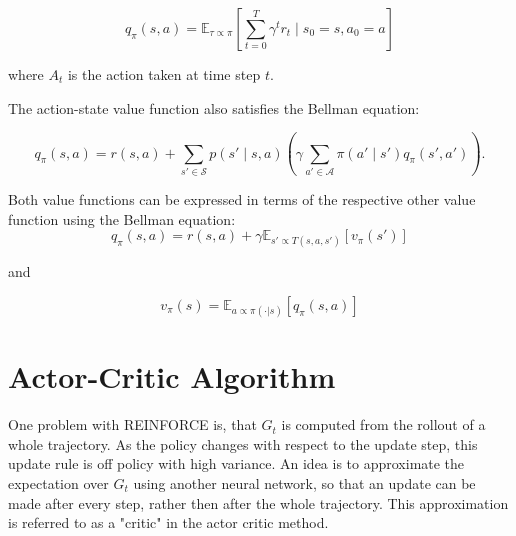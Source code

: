 \begin{equation}
    q_{\pi}(s, a) = \mathbb{E}_{\tau \propto \pi}\left[\sum_{t=0}^T \gamma^t r_t \mid s_0 = s, a_0=a\right]
\end{equation}

where $A_t$ is the action taken at time step $t$.

The action-state value function also satisfies the Bellman equation:

\begin{equation}
    \label{bmeq_q}
    q_{\pi}(s,a) = r(s,a) + \sum_{s' \in \mathcal{S}} p(s' \mid s,a) \left(\gamma \sum_{a' \in \mathcal{A}} \pi(a' \mid s') q_{\pi}(s',a')\right).
\end{equation}

Both value functions can be expressed in terms of the respective other value function using the Bellman equation:
\begin{equation}
    \label{q_from_v}
    q_{\pi}(s,a) = r(s,a) + \gamma \mathbb{E}_{s'\propto T(s,a,s')}\left[ v_{\pi}(s') \right]
\end{equation}

and 

\begin{equation}
    v_{\pi}(s) = \mathbb{E}_{a \propto \pi(\cdot|s)} \left[ q_\pi(s,a) \right]
\end{equation}



\section{Actor-Critic Algorithm}
\label{AC-Alg}
One problem with REINFORCE is, that $G_t$ is computed from the rollout of a whole trajectory. As the policy changes with respect to the update step, this update 
rule is off policy with high variance. An idea is to approximate the expectation over $G_t$ using another neural network, so that an update can be made after every step, 
rather then after the whole trajectory. This approximation is referred to as a "critic" in the actor critic method.
